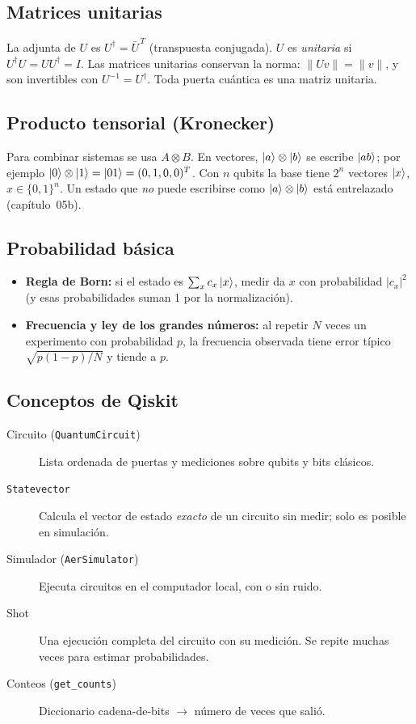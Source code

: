 \subsection{Matrices unitarias}
La adjunta de $U$ es $U^\dagger=\bar U^{\,T}$ (transpuesta conjugada). $U$ es
\emph{unitaria} si $U^\dagger U=UU^\dagger=I$. Las matrices unitarias
conservan la norma: $\|U v\|=\|v\|$, y son invertibles con $U^{-1}=U^\dagger$.
Toda puerta cuántica es una matriz unitaria.

\subsection{Producto tensorial (Kronecker)}
Para combinar sistemas se usa $A\otimes B$. En vectores,
$\left|a\right\rangle\otimes\left|b\right\rangle$ se escribe $\left|ab\right\rangle$; por ejemplo
$\left|0\right\rangle\otimes\left|1\right\rangle=\left|01\right\rangle=(0,1,0,0)^T$. Con $n$ qubits la base tiene
$2^n$ vectores $\left|x\right\rangle$, $x\in\{0,1\}^n$. Un estado que \emph{no} puede
escribirse como $\left|a\right\rangle\otimes\left|b\right\rangle$ está entrelazado (capítulo~05b).

\subsection{Probabilidad básica}
\begin{itemize}
  \item \textbf{Regla de Born:} si el estado es $\sum_x c_x\left|x\right\rangle$, medir da
    $x$ con probabilidad $|c_x|^2$ (y esas probabilidades suman 1 por la
    normalización).
  \item \textbf{Frecuencia y ley de los grandes números:} al repetir $N$ veces
    un experimento con probabilidad $p$, la frecuencia observada tiene error
    típico $\sqrt{p(1-p)/N}$ y tiende a $p$.
\end{itemize}

\subsection{Conceptos de Qiskit}
\begin{description}
  \item[Circuito (\texttt{QuantumCircuit})] Lista ordenada de puertas y
    mediciones sobre qubits y bits clásicos.
  \item[\texttt{Statevector}] Calcula el vector de estado \emph{exacto} de un
    circuito sin medir; solo es posible en simulación.
  \item[Simulador (\texttt{AerSimulator})] Ejecuta circuitos en el
    computador local, con o sin ruido.
  \item[Shot] Una ejecución completa del circuito con su medición. Se repite
    muchas veces para estimar probabilidades.
  \item[Conteos (\texttt{get\_counts})] Diccionario cadena-de-bits $\to$ número
    de veces que salió.
\end{description}

